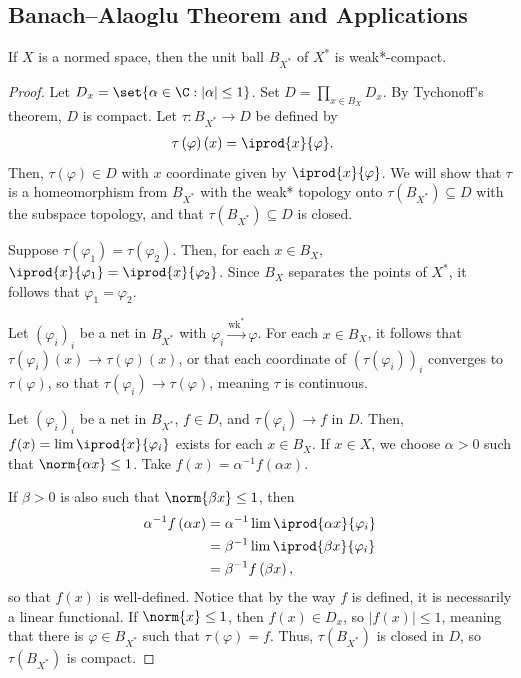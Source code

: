 \documentclass[10pt]{mypackage}
\begin{document}
\subsection{Banach--Alaoglu Theorem and Applications}%
\begin{theorem}
  If $X$ is a normed space, then the unit ball $B_{X^{\ast}}$ of $X^{\ast}$ is weak*-compact.
\end{theorem}
\begin{proof}
  Let $D_x = \set{\alpha\in \C : \left\vert \alpha \right\vert\leq 1}$. Set $D = \prod_{x\in B_X}D_x$. By Tychonoff's theorem, $D$ is compact. Let $\tau\colon B_{X^{\ast}}\rightarrow D$ be defined by
  \begin{align*}
    \tau\left( \varphi \right)\left( x \right) &= \iprod{x}{\varphi}.
  \end{align*}
  Then, $\tau\left( \varphi \right)\in D$ with $x$ coordinate given by $ \iprod{x}{\varphi} $. We will show that $\tau$ is a homeomorphism from $B_{X^{\ast}}$ with the weak* topology onto $\tau\left( B_{X^{\ast}} \right)\subseteq D$ with the subspace topology, and that $\tau\left( B_{X^{\ast}} \right)\subseteq D$ is closed.

  Suppose $\tau\left( \varphi_1 \right) = \tau\left( \varphi_2 \right)$. Then, for each $x\in B_X$, $ \iprod{x}{\varphi_1} = \iprod{x}{\varphi_2} $. Since $B_X$ separates the points of $X^{\ast}$, it follows that $\varphi_1 = \varphi_2$.

  Let $\left( \varphi_i \right)_{i}$ be a net in $B_{X^{\ast}}$ with $\varphi_i\xrightarrow{\operatorname{wk}^{\ast}} \varphi$. For each $x\in B_X$, it follows that $\tau\left( \varphi_i \right)(x)\rightarrow \tau\left( \varphi \right)(x)$, or that each coordinate of $\left( \tau\left( \varphi_i \right) \right)_{i}$ converges to $\tau\left( \varphi \right)$, so that $\tau\left( \varphi_i \right)\rightarrow \tau\left( \varphi \right)$, meaning $\tau$ is continuous.

  Let $\left( \varphi_i \right)_i$ be a net in $B_{X^{\ast}}$, $f\in D$, and $\tau\left( \varphi_i \right)\rightarrow f$ in $D$. Then, $f(x) = \lim\iprod{x}{\varphi_i}$ exists for each $x\in B_X$. If $x\in X$, we choose $\alpha > 0$ such that $\norm{\alpha x} \leq 1$. Take $f(x) = \alpha^{-1}f\left( \alpha x \right)$.

  If $\beta > 0$ is also such that $\norm{\beta x} \leq 1$, then 
  \begin{align*}
    \alpha^{-1}f\left( \alpha x \right) &= \alpha^{-1} \lim \iprod{\alpha x}{\varphi_i}\\
                                        &= \beta^{-1} \lim \iprod{\beta x}{\varphi_i}\\
                                        &= \beta^{-1} f\left( \beta x \right),
  \end{align*}
  so that $f(x)$ is well-defined. Notice that by the way $f$ is defined, it is necessarily a linear functional. If $\norm{x}\leq 1$, then $f(x)\in D_x$, so $ \left\vert f(x) \right\vert\leq 1 $, meaning that there is $\varphi\in B_{X^{\ast}}$ such that $\tau\left( \varphi \right) = f$. Thus, $\tau\left( B_{X^{\ast}} \right)$ is closed in $D$, so $\tau\left( B_{X^{\ast}} \right)$ is compact.
\end{proof}
\end{document}
